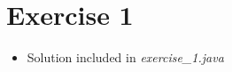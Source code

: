 \documentclass[12pt]{article}
\begin{document}
\bigskip

\section{Exercise 1}

\bigskip

\begin{itemize}
    \item Solution included in \textit{exercise\_1.java}
\end{itemize}
\end{document}
